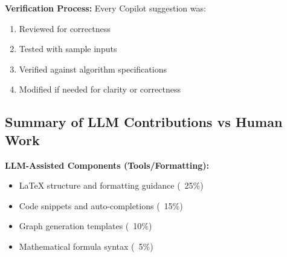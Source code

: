 \documentclass[conference]{IEEEtran}
\begin{document}
\textbf{Verification Process:}
Every Copilot suggestion was:
\begin{enumerate}
    \item Reviewed for correctness
    \item Tested with sample inputs
    \item Verified against algorithm specifications
    \item Modified if needed for clarity or correctness
\end{enumerate}

\subsection{Summary of LLM Contributions vs Human Work}

\textbf{LLM-Assisted Components (Tools/Formatting):}
\begin{itemize}
    \item LaTeX structure and formatting guidance (~25\%)
    \item Code snippets and auto-completions (~15\%)
    \item Graph generation templates (~10\%)
    \item Mathematical formula syntax (~5\%)
\end{itemize}
\end{document}
